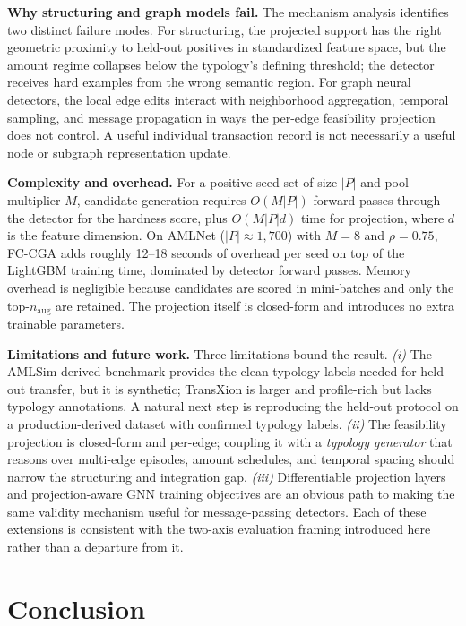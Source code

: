 \documentclass[sigconf,review,anonymous]{acmart}
\newcommand{\fcca}{\textsc{FC-CGA}\xspace}
\begin{document}
\textbf{Why structuring and graph models fail.}
The mechanism analysis identifies two distinct failure modes. For
structuring, the projected support has the right geometric proximity to
held-out positives in standardized feature space, but the amount regime
collapses below the typology's defining threshold; the detector receives hard
examples from the wrong semantic region. For graph neural detectors, the
local edge edits interact with neighborhood aggregation, temporal sampling,
and message propagation in ways the per-edge feasibility projection does not
control. A useful individual transaction record is not necessarily a useful
node or subgraph representation update.

\textbf{Complexity and overhead.}
For a positive seed set of size $|P|$ and pool multiplier $M$, candidate
generation requires $O(M|P|)$ forward passes through the detector for the
hardness score, plus $O(M|P|d)$ time for projection, where $d$ is the feature
dimension. On AMLNet ($|P|\!\approx\!1{,}700$) with $M{=}8$ and $\rho{=}0.75$,
\fcca adds roughly 12--18 seconds of overhead per seed on top of the
LightGBM training time, dominated by detector forward passes. Memory overhead
is negligible because candidates are scored in mini-batches and only the
top-$n_{\mathrm{aug}}$ are retained. The projection itself is closed-form and
introduces no extra trainable parameters.

\textbf{Limitations and future work.}
Three limitations bound the result. \emph{(i)} The AMLSim-derived benchmark
provides the clean typology labels needed for held-out transfer, but it is
synthetic; TransXion is larger and profile-rich but lacks typology
annotations. A natural next step is reproducing the held-out protocol on a
production-derived dataset with confirmed typology labels. \emph{(ii)} The
feasibility projection is closed-form and per-edge; coupling it with a
\emph{typology generator} that reasons over multi-edge episodes, amount
schedules, and temporal spacing should narrow the structuring and
integration gap. \emph{(iii)} Differentiable projection layers and
projection-aware GNN training objectives are an obvious path to making the
same validity mechanism useful for message-passing detectors. Each of these
extensions is consistent with the two-axis evaluation framing introduced
here rather than a departure from it.

\section{Conclusion}
\label{sec:conclusion}
\end{document}
